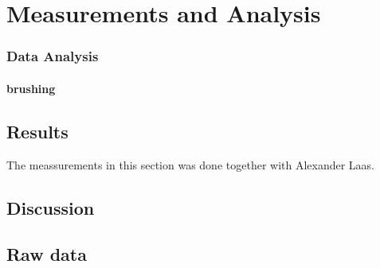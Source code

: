 \documentclass[]{report}
\begin{document}
%

%

\part{Measurements and Analysis}
\section{Data Analysis}


\subsection{brushing}

\chapter{Results}
The meassurements in this section was done together with Alexander Laas.


\chapter{Discussion}

\appendix
\chapter{Raw data}

%
%
%
%
%


\end{document}
